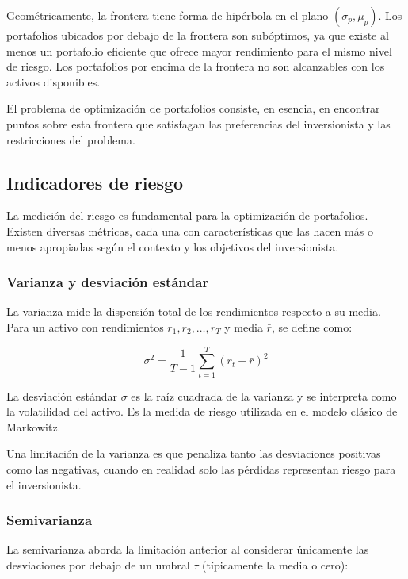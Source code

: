 Geométricamente, la frontera tiene forma de hipérbola en el plano
$(\sigma_p, \mu_p)$. Los portafolios ubicados por debajo de la
frontera son subóptimos, ya que existe al menos un portafolio
eficiente que ofrece mayor rendimiento para el mismo nivel de riesgo.
Los portafolios por encima de la frontera no son alcanzables con los
activos disponibles.

El problema de optimización de portafolios consiste, en esencia, en
encontrar puntos sobre esta frontera que satisfagan las preferencias
del inversionista y las restricciones del problema.

\subsection{Indicadores de riesgo}

La medición del riesgo es fundamental para la optimización de
portafolios. Existen diversas métricas, cada una con características
que las hacen más o menos apropiadas según el contexto y los
objetivos del inversionista.

\subsubsection{Varianza y desviación estándar}

La varianza mide la dispersión total de los rendimientos respecto a
su media. Para un activo con rendimientos $r_1, r_2, \ldots, r_T$ y
media $\bar{r}$, se define como:

\begin{equation}
  \sigma^2 = \frac{1}{T-1} \sum_{t=1}^{T} (r_t - \bar{r})^2
\end{equation}

La desviación estándar $\sigma$ es la raíz cuadrada de la varianza y
se interpreta como la volatilidad del activo. Es la medida de riesgo
utilizada en el modelo clásico de Markowitz.

Una limitación de la varianza es que penaliza tanto las desviaciones
positivas como las negativas, cuando en realidad solo las pérdidas
representan riesgo para el inversionista.

\subsubsection{Semivarianza}

La semivarianza aborda la limitación anterior al considerar
únicamente las desviaciones por debajo de un umbral $\tau$
(típicamente la media o cero):

